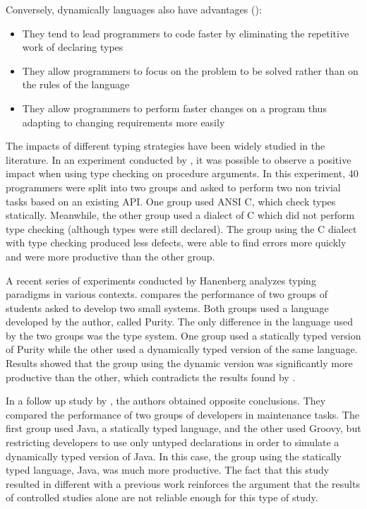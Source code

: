 \documentclass[msc]{ppgccufmg}
\begin{document}
Conversely, dynamically languages also have advantages (\cite{types_and_programming_languages, dynamically_typed_languages}):
\begin{itemize}
	\item They tend to lead programmers to code faster by eliminating the repetitive work of declaring types
	\item They allow programmers to focus on the problem to be solved rather than on the rules of the language 
	\item They allow programmers to perform faster changes on a program thus adapting to changing requirements more easily
\end{itemize}

The impacts of different typing strategies have been widely studied in the literature.
In an experiment conducted by \cite{Prechelt98}, it was possible to observe a positive impact when using type checking on procedure arguments.
In this experiment, 40 programmers were split into two groups and asked to perform two non trivial tasks based on an existing API.
One group used ANSI C, which check types statically.
Meanwhile, the other group used a dialect of C which did not perform type checking (although types were still declared).
The group using the C dialect with type checking produced less defects, were able to find errors more quickly and were more productive than the other group.

A recent series of experiments conducted by Hanenberg analyzes typing paradigms in various contexts.
\cite{experiment_with_purity} compares the performance of two groups of students asked to develop two small systems. 
Both groups used a language developed by the author, called Purity. 
The only difference in the language used by the two groups was the type system.
One group used a statically typed version of Purity while the other used a dynamically typed version of the same language.
Results showed that the group using the dynamic version was significantly more productive than the other, which contradicts the results found by \cite{Prechelt98}. 

In a follow up study by \cite{hanenberg_icpc}, the authors obtained opposite conclusions. 
They compared the performance of two groups of developers in maintenance tasks. 
The first group used Java, a statically typed language, and the other used Groovy, but restricting developers to use only untyped declarations in order to simulate a dynamically typed version of Java.
In this case, the group using the statically typed language, Java, was much more productive.
The fact that this study resulted in different with a previous work reinforces the argument that the results of controlled studies alone are not reliable enough for this type of study.
\end{document}
